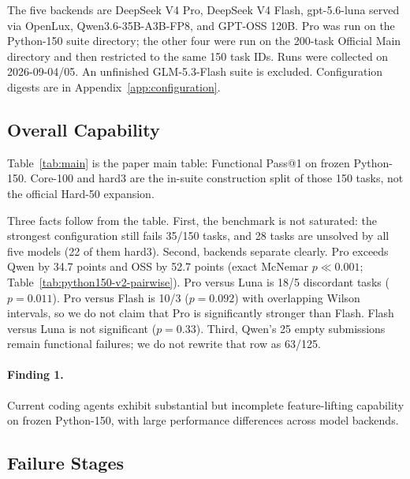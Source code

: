 The five backends are DeepSeek V4 Pro, DeepSeek V4 Flash, gpt-5.6-luna
served via OpenLux, Qwen3.6-35B-A3B-FP8, and GPT-OSS 120B. Pro was run on
the Python-150 suite directory; the other four were run on the 200-task
Official Main directory and then restricted to the same 150 task IDs. Runs
were collected on 2026-09-04/05. An unfinished GLM-5.3-Flash suite is
excluded. Configuration digests are in Appendix~\ref{app:configuration}.

\subsection{Overall Capability}
\label{sec:capability}

Table~\ref{tab:main} is the paper main table: Functional Pass@1 on frozen
Python-150. Core-100 and hard3 are the in-suite construction split of those
150 tasks, not the official Hard-50 expansion.

\begin{table}[t]
  \caption{Functional Pass@1 on freeze~v2 Python-150 (Official Main,
  OpenHands). Empty submissions count as failures. Core-100 / hard3 is the
  in-suite construction split.}
  \label{tab:main}
  \centering
  
\end{table}

Three facts follow from the table. First, the benchmark is not saturated:
the strongest configuration still fails 35/150 tasks, and 28 tasks are
unsolved by all five models (22 of them hard3). Second, backends separate
clearly. Pro exceeds Qwen by 34.7 points and OSS by 52.7 points (exact
McNemar $p\ll 0.001$; Table~\ref{tab:python150-v2-pairwise}). Pro versus Luna
is 18/5 discordant tasks ($p=0.011$). Pro versus Flash is 10/3 ($p=0.092$)
with overlapping Wilson intervals, so we do not claim that Pro is
significantly stronger than Flash. Flash versus Luna is not significant
($p=0.33$). Third, Qwen's 25 empty submissions remain functional failures;
we do not rewrite that row as 63/125.

\paragraph{Finding 1.}
Current coding agents exhibit substantial but incomplete feature-lifting
capability on frozen Python-150, with large performance differences across
model backends.

\subsection{Failure Stages}
\label{sec:stages}

